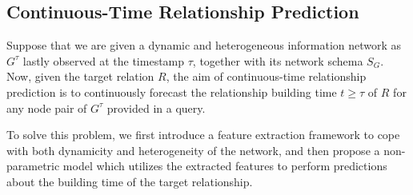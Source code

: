 \subsection{Continuous-Time Relationship Prediction}
Suppose that we are given a dynamic and heterogeneous information network as $G^{\tau}$ lastly observed at the timestamp $\tau$, together with its network schema $S_G$. Now, given the target relation $R$, the aim of continuous-time relationship prediction is to continuously forecast the relationship building time $t\ge \tau$ of $R$ for any node pair of $G^{\tau}$ provided in a query.

To solve this problem, we first introduce a feature extraction framework to cope with both dynamicity and heterogeneity of the network, and then propose a non-parametric model which utilizes the extracted features to perform predictions about the building time of the target relationship.
